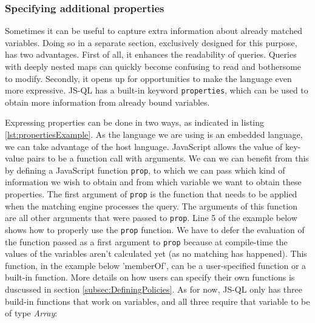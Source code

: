 \subsubsection{Specifying additional properties}

Sometimes it can be useful to capture extra information about already matched variables. Doing so in a separate section, exclusively designed for this purpose, has two advantages. First of all, it enhances the readability of queries. Queries with deeply nested maps can quickly become confusing to read and bothersome to modify. Secondly, it opens up for opportunities to make the language even more expressive. JS-QL has a built-in keyword \texttt{properties}, which can be used to obtain more information from already bound variables. 

Expressing properties can be done in two ways, as indicated in listing \ref{lst:propertiesExample}. As the language we are using is an embedded language, we can take advantage of the host language. JavaScript allows the value of key-value pairs to be a function call with arguments. We can we can benefit from this by defining a JavaScript function \texttt{prop}, to which we can pass which kind of information we wish to obtain and from which variable we want to obtain these properties. The first argument of \texttt{prop} is the function that needs to be applied when the matching engine processes the query. The arguments of this function are all other arguments that were passed to \texttt{prop}. Line 5 of the example below shows how to properly use the \texttt{prop} function. We have to defer the evaluation of the function passed as a first argument to \texttt{prop} because at compile-time the values of the variables aren't calculated yet (as no matching has happened). This function, in the example below 'memberOf', can be a user-specified function or a built-in function. More details on how users can specify their own functions is duscussed in section \ref{subsec:DefiningPolicies}. As for now, JS-QL only has three build-in functions that work on variables, and all three require that variable to be of type \textit{Array}:

